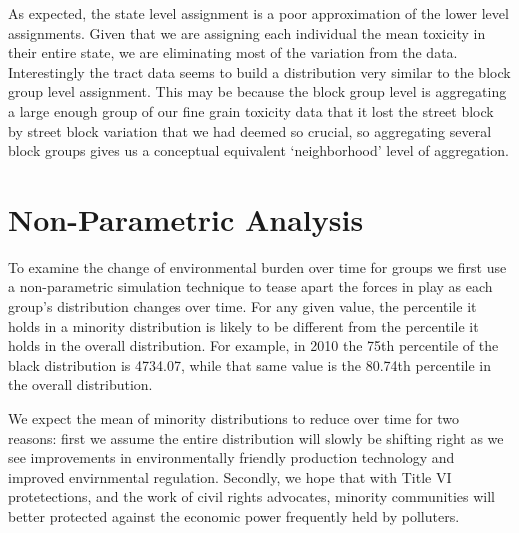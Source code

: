 \documentclass[12pt,twoside]{dukestatscithesis}
\theoremstyle{definition}
\theoremstyle{definition}
\theoremstyle{definition}
\theoremstyle{remark}
\begin{document}
As expected, the state level assignment is a poor approximation of the
lower level assignments. Given that we are assigning each individual the
mean toxicity in their entire state, we are eliminating most of the
variation from the data. Interestingly the tract data seems to build a
distribution very similar to the block group level assignment. This may
be because the block group level is aggregating a large enough group of
our fine grain toxicity data that it lost the street block by street
block variation that we had deemed so crucial, so aggregating several
block groups gives us a conceptual equivalent `neighborhood' level of
aggregation.

\section{Non-Parametric Analysis}\label{non-parametric-analysis}

To examine the change of environmental burden over time for groups we
first use a non-parametric simulation technique to tease apart the
forces in play as each group's distribution changes over time. For any
given value, the percentile it holds in a minority distribution is
likely to be different from the percentile it holds in the overall
distribution. For example, in 2010 the 75th percentile of the black
distribution is 4734.07, while that same value is the 80.74th percentile
in the overall distribution.

We expect the mean of minority distributions to reduce over time for two
reasons: first we assume the entire distribution will slowly be shifting
right as we see improvements in environmentally friendly production
technology and improved envirnmental regulation. Secondly, we hope that
with Title VI protetections, and the work of civil rights advocates,
minority communities will better protected against the economic power
frequently held by polluters.
\end{document}
